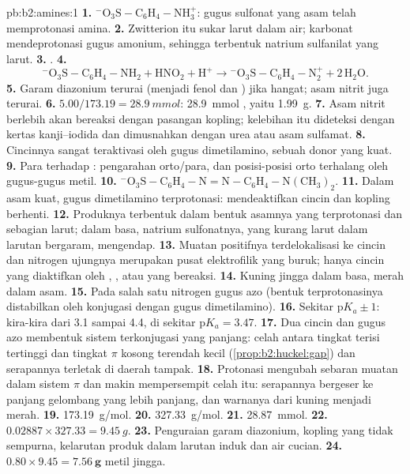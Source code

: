 \begin{solution}{pb:b2:amines:1}
\textbf{1.} $\mathrm{{}^-O_3S{-}C_6H_4{-}NH_3^+}$: gugus sulfonat yang asam telah memprotonasi amina.
\textbf{2.} Zwitterion itu sukar larut dalam air; karbonat mendeprotonasi
gugus amonium, sehingga terbentuk natrium sulfanilat yang larut.
\textbf{3.} .
\textbf{4.}
\[
  \mathrm{{}^-O_3S{-}C_6H_4{-}NH_2 + HNO_2 + H^+ \to {}^-O_3S{-}C_6H_4{-}N_2^+ + 2\,H_2O} .
\]
\textbf{5.} Garam diazonium terurai (menjadi fenol dan ) jika hangat;
asam nitrit juga terurai.
\textbf{6.} $5.00/173.19 = \qty{28.9}{mmol}$: \qty{28.9}{mmol} , yaitu \qty{1.99}{g}.
\textbf{7.} Asam nitrit berlebih akan bereaksi dengan pasangan kopling;
kelebihan itu dideteksi dengan kertas kanji--iodida dan dimusnahkan dengan
urea atau asam sulfamat.
\textbf{8.} Cincinnya sangat teraktivasi oleh gugus dimetilamino, sebuah
donor yang kuat.
\textbf{9.} Para terhadap : pengarahan orto/para, dan
posisi-posisi orto terhalang oleh gugus-gugus metil.
\textbf{10.} $\mathrm{{}^-O_3S{-}C_6H_4{-}N{=}N{-}C_6H_4{-}N(CH_3)_2}$.
\textbf{11.} Dalam asam kuat, gugus dimetilamino terprotonasi: 
mendeaktifkan cincin dan kopling berhenti.
\textbf{12.} Produknya terbentuk dalam bentuk asamnya yang terprotonasi dan
sebagian larut; dalam basa, natrium sulfonatnya, yang kurang larut dalam
larutan bergaram, mengendap.
\textbf{13.} Muatan positifnya terdelokalisasi ke cincin dan nitrogen
ujungnya merupakan pusat elektrofilik yang buruk; hanya cincin yang
diaktifkan oleh , , atau  yang bereaksi.
\textbf{14.} Kuning jingga dalam basa, merah dalam asam.
\textbf{15.} Pada salah satu nitrogen gugus azo (bentuk terprotonasinya
distabilkan oleh konjugasi dengan gugus dimetilamino).
\textbf{16.} Sekitar $\mathrm pK_a \pm 1$: kira-kira dari 3.1 sampai 4.4, di sekitar $\mathrm pK_a = 3.47$.
\textbf{17.} Dua cincin dan gugus azo membentuk sistem terkonjugasi yang
panjang: celah antara tingkat terisi tertinggi dan tingkat $\pi$ kosong
terendah kecil (\cref{prop:b2:huckel:gap}) dan serapannya terletak di daerah
tampak.
\textbf{18.} Protonasi mengubah sebaran muatan dalam sistem $\pi$ dan makin
mempersempit celah itu: serapannya bergeser ke panjang gelombang yang lebih
panjang, dan warnanya dari kuning menjadi merah.
\textbf{19.} \qty{173.19}{g/mol}.
\textbf{20.} \qty{327.33}{g/mol}.
\textbf{21.} \qty{28.87}{mmol}.
\textbf{22.} $0.02887 \times 327.33 = \qty{9.45}{g}$.
\textbf{23.} Penguraian garam diazonium, kopling yang tidak sempurna,
kelarutan produk dalam larutan induk dan air cucian.
\textbf{24.} $0.80 \times 9.45 = \boldsymbol{\qty{7.56}{g}}$ metil jingga.
\end{solution}

